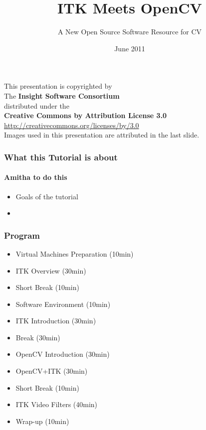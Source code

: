 \documentclass[18pt]{beamer}
\begin{document}
\title[ITK - OpenCV]{ITK Meets OpenCV}
\subtitle[ITK-OpenCV]{A New Open Source Software Resource for CV}
\date[June 2011]{June 2011}

\begin{frame}
\titlepage
\end{frame}


{
\begin{frame}[plain]
\center
\begin{center}
This presentation is copyrighted by\\
The \textbf{Insight Software Consortium}\\
\bigskip
distributed under the\\
\textbf{Creative Commons by Attribution License 3.0}\\
\url{http://creativecommons.org/licenses/by/3.0}\\
\bigskip
Images used in this presentation are attributed in the last slide.
\end{center}
\end{frame}
}


\begin{frame}
  \tableofcontents
\end{frame}


\begin{frame}
\frametitle{What this Tutorial is about}
\framesubtitle{Amitha to do this}
\begin{itemize}
\item Goals of the tutorial
\item 
\end{itemize}
\end{frame}


\begin{frame}
\frametitle{Program}
\begin{itemize}
\item Virtual Machines Preparation (10min)
\pause
\item ITK Overview (30min)
\pause
\item Short Break (10min)
\pause
\item Software Environment (10min)
\pause
\item ITK Introduction (30min)
\pause
\item Break (30min)
\pause
\item OpenCV Introduction (30min)
\pause
\item OpenCV+ITK (30min)
\pause
\item Short Break (10min)
\pause
\item ITK Video Filters (40min)
\pause
\item Wrap-up (10min)
\end{itemize}
\end{frame}















\end{document}

